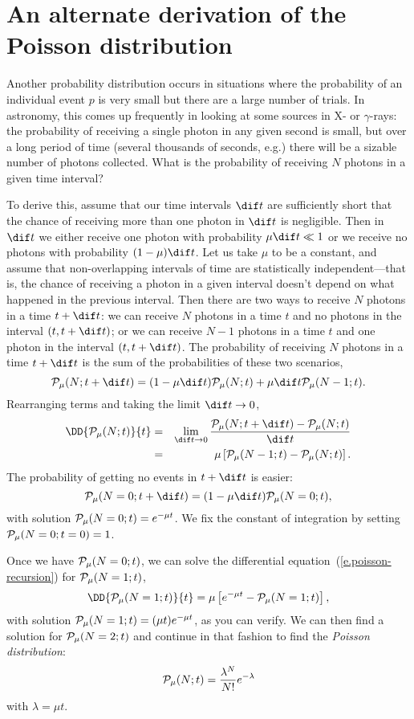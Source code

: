 \section{An alternate derivation of the Poisson distribution}
Another probability distribution occurs in situations where the probability of an individual event $p$ is very small but there are a large number of trials.  In astronomy, this comes up frequently in looking at some sources in X- or $\gamma$-rays: the probability of receiving a single photon in any given second is small, but over a long period of time (several thousands of seconds, e.g.) there will be a sizable number of photons collected.  What is the probability of receiving $N$ photons in a given time interval?

To derive this, assume that our time intervals $\dif t$ are sufficiently short that the chance of receiving more than one photon in $\dif t$ is negligible.  Then in $\dif t$ we either receive one photon with probability $\mu\dif t \ll 1$ or we receive no photons with probability $(1-\mu)\dif t$.  Let us take $\mu$ to be a constant, and assume that non-overlapping intervals of time are statistically independent---that is, the chance of receiving a photon in a given interval doesn't depend on what happened in the previous interval.  Then there are two ways to receive $N$ photons in a time $t+\dif t$: we can receive $N$ photons in a time $t$ and no photons in the interval $(t,t+\dif t)$; or we can receive $N-1$ photons in a time $t$ and one photon in the interval $(t,t+\dif t)$.  The probability of receiving $N$ photons in a time $t+\dif t$ is the sum of the probabilities of these two scenarios,
\[
	\prob_{\mu}(N;t+\dif t) = (1-\mu\dif t)\prob_{\mu}(N;t) + \mu\dif t \prob_{\mu}(N-1;t).
\]
Rearranging terms and taking the limit $\dif t \to 0$,
\begin{eqnarray}
\DD{\prob_{\mu}(N;t)}{t} &=& \lim_{\dif t\to 0} \frac{\prob_{\mu}(N;t+\dif t)-\prob_{\mu}(N;t)}{\dif t} \nonumber\\
&=& \mu\left[\prob_{\mu}(N-1;t)-\prob_{\mu}(N;t)\right].
\label{e.poisson-recursion}
\end{eqnarray}
The probability of getting no events in $t+\dif t$ is easier:
\[ \prob_{\mu}(N=0;t+\dif t) = (1-\mu\dif t)\prob_{\mu}(N=0;t), \]
with solution $\mathcal{P}_{\mu}(N=0;t) = e^{-\mu t}$.  We fix the constant of integration by setting $\mathcal{P}_{\mu}(N=0;t=0) = 1$.

Once we have $\mathcal{P}_{\mu}(N=0;t)$, we can solve the differential equation~(\ref{e.poisson-recursion}) for $\mathcal{P}_{\mu}(N=1;t)$,
\[ \DD{\prob_{\mu}(N=1;t)}{t} = \mu\left[e^{-\mu t} - \prob_{\mu}(N=1;t)\right], \]
with solution $\mathcal{P}_{\mu}(N=1;t) = (\mu t)e^{-\mu t}$, as you can verify.  We can then find a solution for $\mathcal{P}_{\mu}(N=2;t)$ and continue in that fashion to find the \emph{Poisson distribution}:
\begin{equation}\label{e.Poisson-alt}
	\mathcal{P}_{\mu}(N;t) = \frac{\lambda^{N}}{N!} e^{-\lambda}
\end{equation}
with $\lambda=\mu t$.


